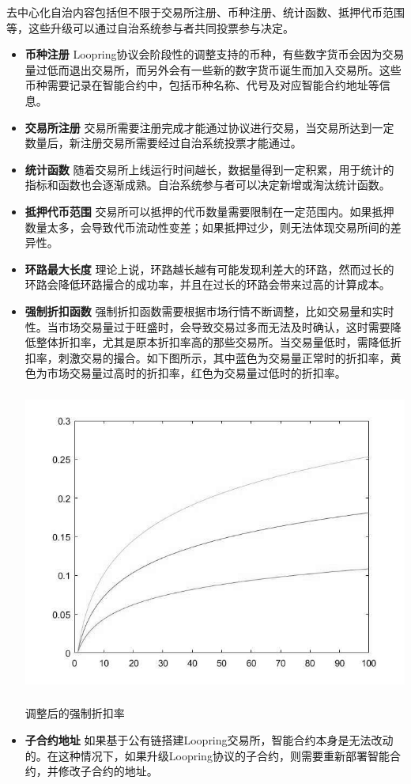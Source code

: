 \documentclass[UTF8,nofonts]{ctexart}
\makeatletter
\newenvironment{figurehere}
  {\def\@captype{figure}}
  {}
\makeatother
\begin{document}
去中心化自治内容包括但不限于交易所注册、币种注册、统计函数、抵押代币范围等，这些升级可以通过自治系统参与者共同投票参与决定。
  \begin{itemize}
    \item \textbf{币种注册} Loopring协议会阶段性的调整支持的币种，有些数字货币会因为交易量过低而退出交易所，而另外会有一些新的数字货币诞生而加入交易所。这些币种需要记录在智能合约中，包括币种名称、代号及对应智能合约地址等信息。
    \item \textbf{交易所注册} 交易所需要注册完成才能通过协议进行交易，当交易所达到一定数量后，新注册交易所需要经过自治系统投票才能通过。
    \item \textbf{统计函数} 随着交易所上线运行时间越长，数据量得到一定积累，用于统计的指标和函数也会逐渐成熟。自治系统参与者可以决定新增或淘汰统计函数。
    \item \textbf{抵押代币范围} 交易所可以抵押的代币数量需要限制在一定范围内。如果抵押数量太多，会导致代币流动性变差；如果抵押过少，则无法体现交易所间的差异性。
    \item \textbf{环路最大长度} 理论上说，环路越长越有可能发现利差大的环路，然而过长的环路会降低环路撮合的成功率，并且在过长的环路会带来过高的计算成本。
    \item \textbf{强制折扣函数} 强制折扣函数需要根据市场行情不断调整，比如交易量和实时性。当市场交易量过于旺盛时，会导致交易过多而无法及时确认，这时需要降低整体折扣率，尤其是原本折扣率高的那些交易所。当交易量低时，需降低折扣率，刺激交易的撮合。如下图所示，其中蓝色为交易量正常时的折扣率，黄色为市场交易量过高时的折扣率，红色为交易量过低时的折扣率。
\begin{center}
\begin{figurehere}
\includegraphics[height=10cm]{images/rate_adjust.jpg}
\caption{调整后的强制折扣率}
\label{fig:dischargeRateAdjust}
\end{figurehere}
\end{center}

    \item \textbf{子合约地址} 如果基于公有链搭建Loopring交易所，智能合约本身是无法改动的。在这种情况下，如果升级Loopring协议的子合约，则需要重新部署智能合约，并修改子合约的地址。
  \end{itemize}
\end{document}
